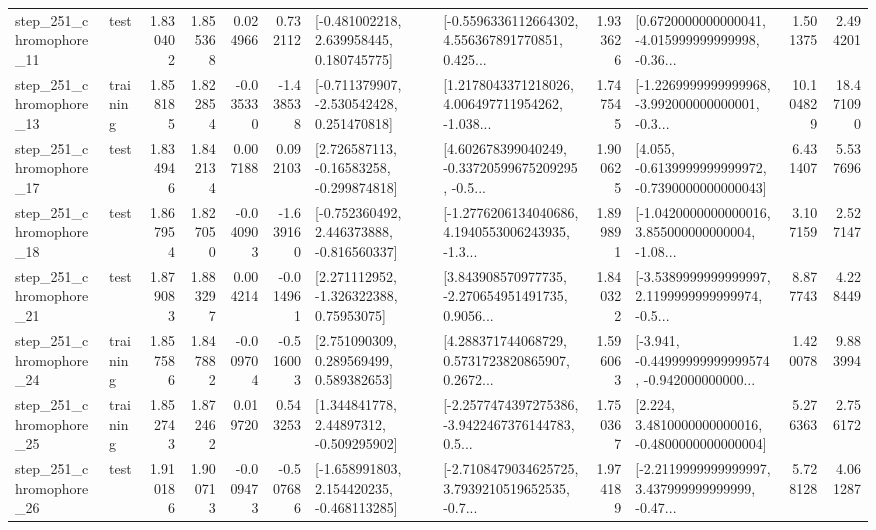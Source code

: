 \begin{tabular}{llrrrrllrlrr}
  step\_251\_chromophore\_11 &      test &      1.830402 &    1.855368 &      0.024966 &  0.732112 &    [-0.481002218, 2.639958445, 0.180745775] &  [-0.5596336112664302, 4.556367891770851, 0.425... &       1.933626 &  [0.6720000000000041, -4.015999999999998, -0.36... &            1.501375 &          2.494201 \\
  step\_251\_chromophore\_13 &  training &      1.858185 &    1.822854 &     -0.035330 & -1.438538 &   [-0.711379907, -2.530542428, 0.251470818] &  [1.2178043371218026, 4.006497711954262, -1.038... &       1.747545 &  [-1.2269999999999968, -3.992000000000001, -0.3... &           10.104829 &         18.471090 \\
  step\_251\_chromophore\_17 &      test &      1.834946 &    1.842134 &      0.007188 &  0.092103 &    [2.726587113, -0.16583258, -0.299874818] &  [4.602678399040249, -0.33720599675209295, -0.5... &       1.900625 &  [4.055, -0.6139999999999972, -0.7390000000000043] &            6.431407 &          5.537696 \\
  step\_251\_chromophore\_18 &      test &      1.867954 &    1.827050 &     -0.040903 & -1.639160 &   [-0.752360492, 2.446373888, -0.816560337] &  [-1.2776206134040686, 4.1940553006243935, -1.3... &       1.899891 &  [-1.0420000000000016, 3.855000000000004, -1.08... &            3.107159 &          2.527147 \\
  step\_251\_chromophore\_21 &      test &      1.879083 &    1.883297 &      0.004214 & -0.014961 &     [2.271112952, -1.326322388, 0.75953075] &  [3.843908570977735, -2.270654951491735, 0.9056... &       1.840322 &  [-3.5389999999999997, 2.1199999999999974, -0.5... &            8.877743 &          4.228449 \\
  step\_251\_chromophore\_24 &  training &      1.857586 &    1.847882 &     -0.009704 & -0.516003 &     [2.751090309, 0.289569499, 0.589382653] &  [4.288371744068729, 0.5731723820865907, 0.2672... &       1.596063 &  [-3.941, -0.44999999999999574, -0.942000000000... &            1.420078 &          9.883994 \\
  step\_251\_chromophore\_25 &  training &      1.852743 &    1.872462 &      0.019720 &  0.543253 &     [1.344841778, 2.44897312, -0.509295902] &  [-2.2577474397275386, -3.9422467376144783, 0.5... &       1.750367 &   [2.224, 3.4810000000000016, -0.4800000000000004] &            5.276363 &          2.756172 \\
  step\_251\_chromophore\_26 &      test &      1.910186 &    1.900713 &     -0.009473 & -0.507686 &   [-1.658991803, 2.154420235, -0.468113285] &  [-2.7108479034625725, 3.7939210519652535, -0.7... &       1.974189 &  [-2.2119999999999997, 3.437999999999999, -0.47... &            5.728128 &          4.061287 \\

\end{tabular}
